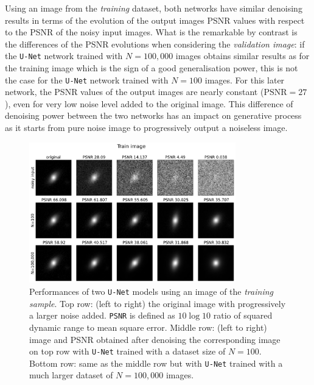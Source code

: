 \documentclass[11pt]{amsart}
\begin{document}
Using an image from the \textit{training} dataset, both networks have similar denoising results in terms of the evolution of the output images  PSNR values with respect to the PSNR of the noisy input images. What is the remarkable by contrast is the differences of the  PSNR evolutions when considering the \textit{validation image}: if the \texttt{U-Net} network trained with $N=100,000$ images obtains similar results as for the training image which is the sign of a good generalisation power, this is  not the case for the \texttt{U-Net} network trained with $N=100$ images. For this later  network, the PSNR values of the output images are nearly constant ($\mathrm{PSNR}=27$), even for very low noise level added to the original image. This difference of denoising power between the two networks has an impact on generative process as it starts from pure noise image to progressively output a noiseless image.
\begin{figure}
    \centering
		\includegraphics[width=0.8\textwidth]{fig-UNet_denoising_perf_train.pdf}
	\caption{Performances of two \texttt{U-Net} models using an image of the \textit{training sample}. Top row: (left to right) the original image with progressively a larger noise added. \texttt{PSNR} is defined as $10 \log10$ ratio of squared dynamic range
to mean square error. Middle row: (left to right) image and PSNR obtained after denoising the corresponding image on top row with \texttt{U-Net} trained with a dataset size of $N=100$. Bottom row: same as the middle row but with \texttt{U-Net} trained with  a much larger dataset of $N=100,000$ images.}
	\label{fig-UNet-denoising-train}
\end{figure}
\end{document}

